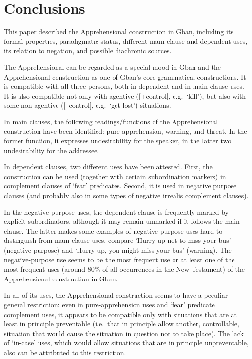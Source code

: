\documentclass[output=paper,colorlinks,citecolor=brown
]{langscibook}
\begin{document}
\section{Conclusions}
\label{sec:fedotov:conclusions}

This paper described the Apprehensional construction in Gban, including its formal properties, paradigmatic status, different main-clause and dependent uses, its relation to negation, and possible diachronic sources.

The Apprehensional can be regarded as a special mood in Gban and the Apprehensional construction as one of Gban's core grammatical constructions. It is compatible with all three persons, both in dependent and in main-clause uses. It is also compatible not only with agentive ([+control], e.g.\ `kill'), but also with some non-agentive ([–control], e.g.\ `get lost') situations.

In main clauses, the following readings\slash functions of the Apprehensional construction have been identified: pure apprehension, warning, and threat. In the former function, it expresses undesirability for the speaker, in the latter two undesirability for the addressee.

In dependent clauses, two different uses have been attested. First, the construction can be used (together with certain subordination markers) in complement clauses of `fear' predicates. Second, it is used in negative purpose clauses (and probably also in some types of negative irrealis complement clauses).

In the negative-purpose uses, the dependent clause is frequently marked by explicit subordinators, although it may remain unmarked if it follows the main clause. The latter makes some examples of negative-purpose uses hard to distinguish from main-clause uses, compare `Hurry up not to miss your bus' (negative purpose) and `Hurry up, you might miss your bus' (warning). The negative-purpose use seems to be the most frequent use or at least one of the most frequent uses (around 80\% of all occurrences in the New Testament) of the Apprehensional construction in Gban.

In all of its uses, the Apprehensional construction seems to have a peculiar general restriction: even in pure-apprehension uses and `fear' predicate complement uses, it appears to be compatible only with situations that are at least in principle preventable (i.e.\ that in principle allow another, controllable, situation that would cause the situation in question not to take place). The lack of `in-case' uses, which would allow situations that are in principle unpreventable, also can be attributed to this restriction.
\end{document}
